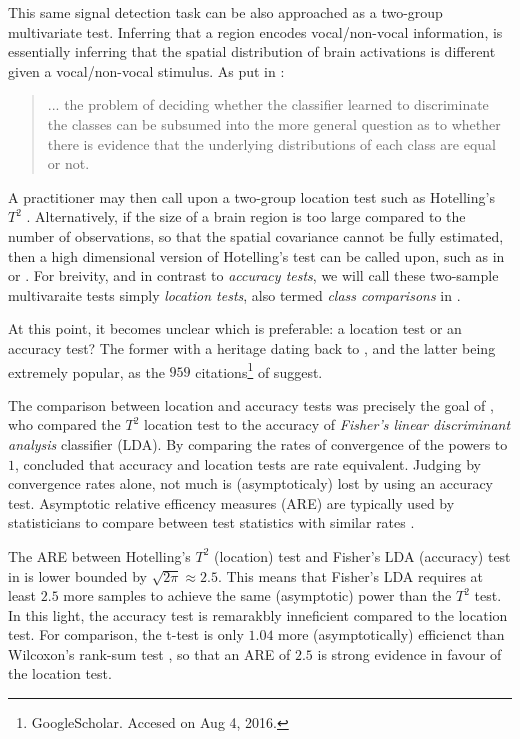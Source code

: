 \documentclass[12pt,a4paper]{article}
\begin{document}
This same signal detection task can be also approached as a two-group multivariate test.
Inferring that a region encodes vocal/non-vocal information, is essentially inferring that the spatial distribution of brain activations is different given a vocal/non-vocal stimulus. 
As put in \cite{pereira_machine_2009}: 
\begin{quote}
... the problem of deciding whether the classifier learned to discriminate the classes can be subsumed into the more general question as to whether there is evidence that the underlying distributions of each class are equal or not.
\end{quote}
A practitioner may then call upon a two-group location test such as Hotelling's $T^2$ \citep{anderson_introduction_2003}.
Alternatively, if the size of a brain region is too large compared to the number of observations, so that the spatial covariance cannot be fully estimated, then a high dimensional version of Hotelling's test can be called upon, such as in \cite{schafer_shrinkage_2005} or \cite{srivastava_testing_2013}.
For breivity, and in contrast to \emph{accuracy tests}, we will call these two-sample multivaraite tests simply \emph{location tests}, also termed \emph{class comparisons} in \cite{simon_pitfalls_2003}.

At this point, it becomes unclear which is preferable: a location test or an accuracy test?
The former with a heritage dating back to \cite{hotelling_generalization_1931}, and the latter being extremely popular, as the $959$ citations\footnote{GoogleScholar. Accesed on Aug 4, 2016.} of \cite{kriegeskorte_information-based_2006} suggest. 

The comparison between location and accuracy tests was precisely the goal of \cite{ramdas_classification_2016}, who compared the $T^2$ location test to the accuracy of \emph{Fisher's linear discriminant analysis} classifier (LDA). 
By comparing the rates of convergence of the powers to $1$, \cite{ramdas_classification_2016} concluded that accuracy and location tests are rate equivalent. 
Judging by convergence rates alone, not much is (asymptoticaly) lost by using an accuracy test. 
Asymptotic relative efficency measures (ARE) are typically used by statisticians to compare between test statistics with similar rates \citep{vaart_asymptotic_1998}.

The ARE between Hotelling's $T^2$ (location) test and Fisher's LDA (accuracy) test in \cite{ramdas_classification_2016} is lower bounded by $\sqrt{2 \pi} \approx 2.5$. 
This means that Fisher's LDA requires at least $2.5$ more samples to achieve the same (asymptotic) power than the $T^2$ test. 
In this light, the accuracy test is remarakbly inneficient compared to the location test.  
For comparison, the t-test is only $1.04$ more (asymptotically) efficienct than Wilcoxon's rank-sum test \citep{lehmann_parametric_2009}, so that an ARE of $2.5$ is strong evidence in favour of the location test. 
\end{document}
